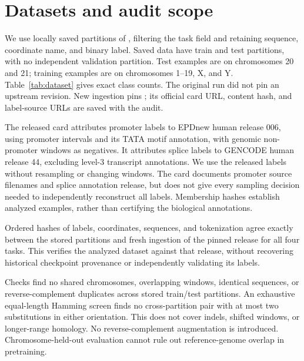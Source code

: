 \section{Datasets and audit scope}
We use locally saved partitions of , filtering the task field and retaining sequence, coordinate name, and binary label. Saved data have train and test partitions, with no independent validation partition. Test examples are on chromosomes 20 and 21; training examples are on chromosomes 1--19, X, and Y. Table~\ref{tab:dataset} gives exact class counts. The original run did not pin an upstream revision. New ingestion pins ; its official card URL, content hash, and label-source URLs are saved with the audit.

The released card attributes promoter labels to EPDnew human release 006, using promoter intervals and its TATA motif annotation, with genomic non-promoter windows as negatives. It attributes splice labels to GENCODE human release 44, excluding level-3 transcript annotations. We use the released labels without resampling or changing windows. The card documents promoter source filenames and splice annotation release, but does not give every sampling decision needed to independently reconstruct all labels. Membership hashes establish analyzed examples, rather than certifying the biological annotations.

Ordered hashes of labels, coordinates, sequences, and tokenization agree exactly between the stored partitions and fresh ingestion of the pinned release for all four tasks. This verifies the analyzed dataset against that release, without recovering historical checkpoint provenance or independently validating its labels.
\begin{table}[t]
\centering\small
\caption{Exact stored class counts. Membership, coordinates, sequence hashes, and orientation-canonical hashes are saved as JSONL.}
\label{tab:dataset}
\DatasetTable
\end{table}

Checks find no shared chromosomes, overlapping windows, identical sequences, or reverse-complement duplicates across stored train/test partitions. An exhaustive equal-length Hamming screen finds no cross-partition pair with at most two substitutions in either orientation. This does not cover indels, shifted windows, or longer-range homology. No reverse-complement augmentation is introduced. Chromosome-held-out evaluation cannot rule out reference-genome overlap in pretraining.

